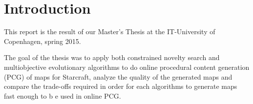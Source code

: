 \section{Introduction}
\label{Intro}

This report is the result of our Master's Thesis at the IT-University of Copenhagen, spring 2015.

The goal of the thesis was to apply both constrained novelty search and multiobjective evolutionary algorithms to do online procedural content generation (PCG) of maps for Starcraft, analyze the quality of the generated maps and compare the trade-offs required in order for each algorithms to generate maps fast enough to b e used in online PCG.
